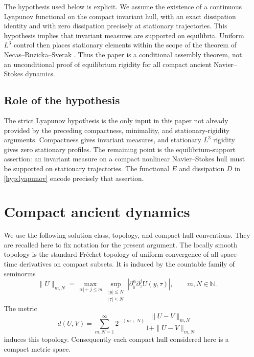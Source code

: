 \documentclass[11pt]{amsart}
\theoremstyle{plain}
\theoremstyle{definition}
\theoremstyle{remark}
\numberwithin{equation}{section}
\begin{document}
The hypothesis used below is explicit.  We assume the existence of a
continuous Lyapunov functional on the compact invariant hull, with an exact
dissipation identity and with zero dissipation precisely at stationary
trajectories.  This hypothesis implies that invariant measures are supported
on equilibria.  Uniform \(L^3\) control then places stationary elements within
the scope of the theorem of Necas--Ruzicka--Sverak \cite{NRS1996}.  Thus the
paper is a conditional assembly theorem, not an unconditional proof of
equilibrium rigidity for all compact ancient Navier--Stokes dynamics.

\subsection{Role of the hypothesis}

The strict Lyapunov hypothesis is the only input in this paper not already
provided by the preceding compactness, minimality, and stationary-rigidity
arguments.  Compactness gives invariant measures, and stationary \(L^3\)
rigidity gives zero stationary profiles.  The remaining point is the
equilibrium-support assertion: an invariant measure on a compact nonlinear
Navier--Stokes hull must be supported on stationary trajectories.  The
functional \(E\) and dissipation \(D\) in \cref{hyp:lyapunov} encode precisely
that assertion.

\section{Compact ancient dynamics}

We use the following solution class, topology, and compact-hull conventions.
They are recalled here to fix notation for the present argument.  The locally
smooth topology is the standard Fr\'echet topology of uniform convergence of
all space-time derivatives on compact subsets.  It is induced by the
countable family of seminorms
\[
   \|U\|_{m,N}
   =
   \max_{|\alpha|+j\le m}
   \sup_{\substack{|y|\le N\\ |\tau|\le N}}
   |\partial_y^\alpha\partial_\tau^jU(y,\tau)|,
   \qquad m,N\in\mathbb N .
\]
The metric
\[
   d(U,V)=
   \sum_{m,N=1}^\infty
   2^{-(m+N)}
   \frac{\|U-V\|_{m,N}}{1+\|U-V\|_{m,N}}
\]
induces this topology.  Consequently each compact hull considered here is a
compact metric space.
\end{document}
